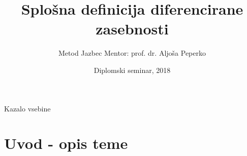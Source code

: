 \documentclass{beamer}
\title[Diferencirana zasebnost] 
{Splošna definicija diferencirane zasebnosti}
\author[Metod Jazbec] 
{Metod Jazbec
\newline
\newline
Mentor: prof. dr. Aljoša Peperko}
\institute[FMF] 
{
  
  Fakulteta za matematiko in fiziko\\
  Univerza v Ljubljani
 }
\date[DS 2018] %
{Diplomski seminar, 2018}
\begin{document}

\begin{frame}
  \titlepage
\end{frame}

\begin{frame}[allowframebreaks]{Kazalo vsebine}
  \tableofcontents
\end{frame}





\section{Uvod - opis teme}
\end{document}

